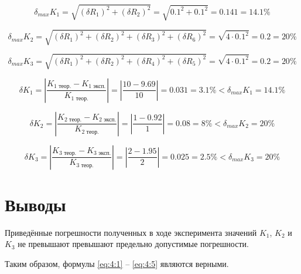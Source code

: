 \begin{displaymath}
	\delta_{max} K_1 = \sqrt{(\delta R_1)^2 + (\delta R_2)^2} = \sqrt{0.1^2 + 0.1^2} = 0.141 = 14.1 \%
\end{displaymath}

\begin{displaymath}
	\delta_{max} K_{2} = \sqrt{(\delta R_1)^2 + (\delta R_2)^2 + (\delta R_3)^2 + (\delta R_6)^2} = \sqrt{4 \cdot 0.1^2} = 0.2 = 20 \%
\end{displaymath}

\begin{displaymath}
	\delta_{max} K_{3} = \sqrt{(\delta R_1)^2 + (\delta R_2)^2 + (\delta R_4)^2 + (\delta R_5)^2} = \sqrt{4 \cdot 0.1^2} = 0.2 = 20 \%
\end{displaymath}

\begin{displaymath}
	\delta K_1 = \left| \frac{K_{1 \text{ теор.}} - K_{1 \text{ эксп.}}}{K_{1 \text{ теор.}}} \right| = \left| \frac{10 - 9.69}{10} \right| = 0.031 = 3.1 \% < \delta_{max} K_{1} = 14.1 \%
\end{displaymath}

\begin{displaymath}
	\delta K_2 = \left| \frac{K_{2 \text{ теор.}} - K_{2 \text{ эксп.}}}{K_{2 \text{ теор.}}} \right| = \left| \frac{1 - 0.92}{1} \right| = 0.08 = 8 \% < \delta_{max} K_{2} = 20 \%
\end{displaymath}

\begin{displaymath}
	\delta K_3 = \left| \frac{K_{3 \text{ теор.}} - K_{3 \text{ эксп.}}}{K_{3 \text{ теор.}}} \right| = \left| \frac{2 - 1.95}{2} \right| = 0.025 = 2.5 \% < \delta_{max} K_{3} = 20 \%
\end{displaymath}

\section{Выводы}

Приведённые погрешности полученных в ходе эксперимента значений $K_1$, $K_2$ и $K_3$ не превышают превышают предельно допустимые погрешности.

Таким образом, формулы \ref{eq:4:1} -- \ref{eq:4:5} являются верными.

